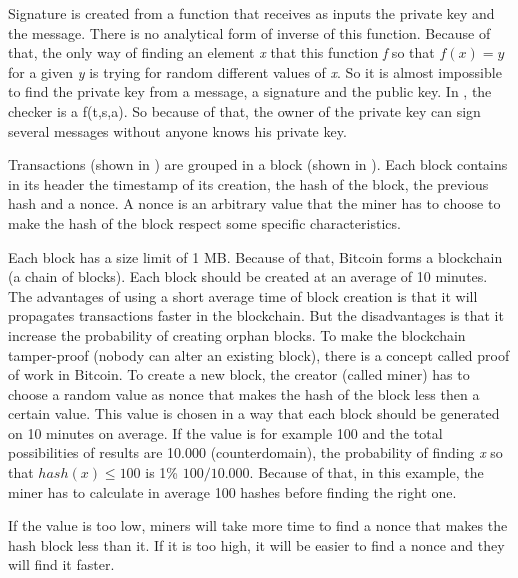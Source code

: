 Signature is created from a function that receives as inputs the private key and the message.
There is no analytical form of inverse of this function.
Because of that, the only way of finding an element \emph{x} that this function \emph{f} so
that $f(x) = y$ for a given \emph{y} is trying for random different values of \emph{x}.
So it is almost impossible to find the private key from a message, a signature and the public key.
In , the checker is a f(t,s,a).
So because of that, the owner of the private key can sign several messages without anyone knows
his private key.


Transactions (shown in ) are grouped in a block (shown in ).
Each block contains in its header the timestamp of its creation, the hash of the block,
the previous hash and a nonce.
A nonce is an arbitrary value that the miner has to choose to make the hash of the block respect some
specific characteristics.


Each block has a size limit of 1 MB.
Because of that, Bitcoin forms a blockchain (a chain of blocks).
Each block should be created at an average of 10 minutes.
The advantages of using a short average time of block creation is that it will propagates transactions
faster in the blockchain.
But the disadvantages is that it increase the probability of creating orphan blocks.
To make the blockchain tamper-proof (nobody can alter an existing block),
there is a concept called proof of work in Bitcoin.
To create a new block, the creator (called miner) has to choose a random value as nonce that makes
the hash of the block less then a certain value.
This value is chosen in a way that each block should be generated on 10 minutes on average.
If the value is for example 100 and the total possibilities of results are 10.000 (counterdomain),
the probability of finding \emph{x} so that $hash(x) \leqslant 100$ is 1\% $100/10.000$.
Because of that, in this example, the miner has to calculate in average 100 hashes before finding
the right one.

If the value is too low, miners will take more time to find a nonce that makes the hash block
less than it.
If it is too high, it will be easier to find a nonce and they will find it faster.

